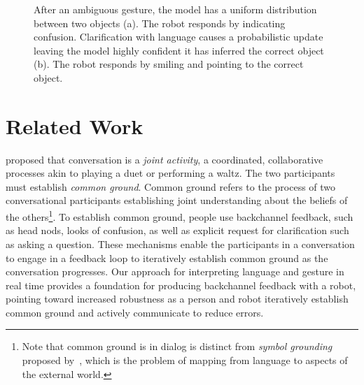 \documentclass[graybox]{svmult}
\begin{document}
\begin{figure}
\centering
{}
\caption{After an ambiguous gesture, the model has a uniform
  distribution between two objects (a).  The robot responds by
  indicating confusion.  Clarification with language causes a
  probabilistic update leaving the model highly confident it has
  inferred the correct object (b).  The robot responds by smiling and
  pointing to the correct object. \label{fig:cartoon}}
\end{figure}


\section{Related Work}

\citet{clark96} proposed that conversation is a {\em joint activity},
a coordinated, collaborative processes akin to playing a duet or
performing a waltz.  The two participants must establish {\em common
  ground}.  Common ground refers to the process of two conversational
participants establishing joint understanding about the beliefs of the
others\footnote{Note that common ground is in dialog is distinct from
  {\em symbol grounding} proposed by~\citet{harnad90}, which is the
  problem of mapping from language to aspects of the external world.}.
To establish common ground, people use backchannel feedback, such as
head nods, looks of confusion, as well as explicit request for
clarification such as asking a question.  These mechanisms enable the
participants in a conversation to engage in a feedback loop to
iteratively establish common ground as the conversation progresses.
Our approach for interpreting language and gesture in real time
provides a foundation for producing backchannel feedback with a robot,
pointing toward increased robustness as a person and robot iteratively
establish common ground and actively communicate to reduce errors.
\end{document}
